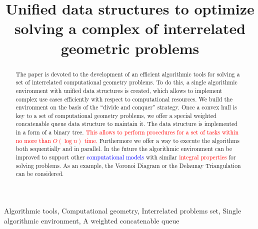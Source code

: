 \documentclass[conference]{IEEEtran}
\theoremstyle{plane}
\begin{document}
\title{Unified data structures to optimize solving a complex of interrelated geometric problems\\
}
\author{
\and
{}
}
\maketitle

\begin{abstract}
The paper is devoted to the development of an efficient algorithmic tools for solving a set of interrelated computational geometry problems. To do this, a single algorithmic environment with unified data structures is created, which allows to implement complex use cases efficiently with respect to computational resources. We build the environment on the basis of the ``divide and conquer'' strategy. 
Once a convex hull is key to a set of computational geometry problems, we offer a special weighted concatenable queue data structure to maintain it. The data structure is implemented in a form of a binary tree. \textcolor{red}{This allows to perform procedures for a set of tasks within no more than $O(\log n)$ time.} Furthermore we offer a way to execute the algorithms both sequentially and in parallel.
In the future the algorithmic environment can be improved to support other \textcolor{blue}{computational models} with similar \textcolor{red}{integral properties} for solving problems. As an example, the Voronoi Diagram or the Delaunay Triangulation can be considered.
\end{abstract}

\begin{IEEEkeywords}
Algorithmic tools,   Computational geometry, Interrelated problems set, Single algorithmic environment, A weighted concatenable queue
\end{IEEEkeywords}
\end{document}
